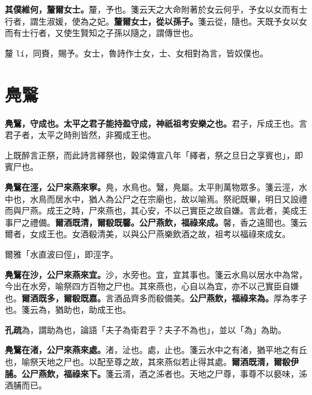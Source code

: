 \textbf{其僕維何，釐爾女士。}{\footnotesize 釐，予也。箋云天之大命附著於女云何乎，予女以女而有士行者，謂生淑媛，使為之妃。}\textbf{釐爾女士，從以孫子。}{\footnotesize 箋云從，隨也。天既予女以女而有士行者，又使生賢知之子孫以隨之，謂傳世也。}

\begin{quoting}釐 \texttt{lí}，同賚，賜予。女士，魯詩作士女，士、女相對為言，皆奴僕也。\end{quoting}

\section{鳧鷖}


\textbf{鳧鷖，守成也。太平之君子能持盈守成，神祇祖考安樂之也。}{\footnotesize 君子，斥成王也。言君子者，太平之時則皆然，非獨成王也。}

\begin{quoting}上既醉言正祭，而此詩言繹祭也，穀梁傳宣八年「繹者，祭之旦日之享賓也」，即賓尸也。\end{quoting}

\textbf{鳧鷖在涇，公尸來燕來寧。}{\footnotesize 鳧，水鳥也。鷖，鳧屬。太平則萬物眾多。箋云涇，水中也，水鳥而居水中，猶人為公尸之在宗廟也，故以喻焉。祭祀既畢，明日又設禮而與尸燕。成王之時，尸來燕也，其心安，不以己實臣之故自嫌。言此者，美成王事尸之禮備。}\textbf{爾酒既清，爾殽既馨。公尸燕飲，福祿來成。}{\footnotesize 馨，香之遠聞也。箋云爾者，女成王也。女酒殽清美，以與公尸燕樂飲酒之故，祖考以福祿來成女。}

\begin{quoting}爾雅「水直波曰俓」，即涇字。\end{quoting}

\textbf{鳧鷖在沙，公尸來燕來宜。}{\footnotesize 沙，水旁也。宜，宜其事也。箋云水鳥以居水中為常，今出在水旁，喻祭四方百物之尸也。其來燕也，心自以為宜，亦不以己實臣自嫌也。}\textbf{爾酒既多，爾殽既嘉。}{\footnotesize 言酒品齊多而殽備美。}\textbf{公尸燕飲，福祿來為。}{\footnotesize 厚為孝子也。箋云為，猶助也，助成王也。}

\begin{quoting}\textbf{孔疏}為，謂助為也，論語「夫子為衛君乎？夫子不為也」，並以「為」為助。\end{quoting}

\textbf{鳧鷖在渚，公尸來燕來處。}{\footnotesize 渚，沚也。處，止也。箋云水中之有渚，猶平地之有丘也，喻祭天地之尸也。以配至尊之故，其來燕似若止得其處。}\textbf{爾酒既湑，爾殽伊脯。公尸燕飲，福祿來下。}{\footnotesize 箋云湑，酒之泲者也。天地之尸尊，事尊不以褻味，泲酒脯而已。}

